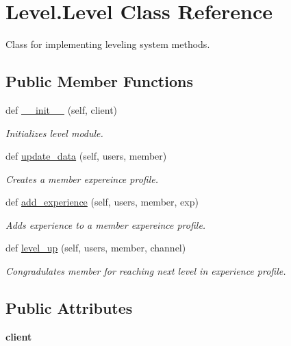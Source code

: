 \hypertarget{class_level_1_1_level}{}\section{Level.\+Level Class Reference}
\label{class_level_1_1_level}


Class for implementing leveling system methods.  


\subsection*{Public Member Functions}
\begin{DoxyCompactItemize}
\item 
\mbox{\label{class_level_1_1_level_ada7c4800433924c5884c2a0b0ad49981}} 
def \mbox{\hyperlink{class_level_1_1_level_ada7c4800433924c5884c2a0b0ad49981}{\+\_\+\+\_\+init\+\_\+\+\_\+}} (self, client)
\begin{DoxyCompactList}\small\item\em Initializes level module. \end{DoxyCompactList}\item 
def \mbox{\hyperlink{class_level_1_1_level_a77f63fe094135039ca050c57be47a366}{update\+\_\+data}} (self, users, member)
\begin{DoxyCompactList}\small\item\em Creates a member expereince profile. \end{DoxyCompactList}\item 
def \mbox{\hyperlink{class_level_1_1_level_a5061dcc8280ed77fe321323ddbc7ab18}{add\+\_\+experience}} (self, users, member, exp)
\begin{DoxyCompactList}\small\item\em Adds experience to a member expereince profile. \end{DoxyCompactList}\item 
def \mbox{\hyperlink{class_level_1_1_level_af36ca548969f8d1d27c3e0eef3ee37e7}{level\+\_\+up}} (self, users, member, channel)
\begin{DoxyCompactList}\small\item\em Congradulates member for reaching next level in experience profile. \end{DoxyCompactList}\end{DoxyCompactItemize}
\subsection*{Public Attributes}
\begin{DoxyCompactItemize}
\item 
\mbox{\label{class_level_1_1_level_aabe114249afbce94cfce4e271d34d6c0}} 
{\bfseries client}
\end{DoxyCompactItemize}


